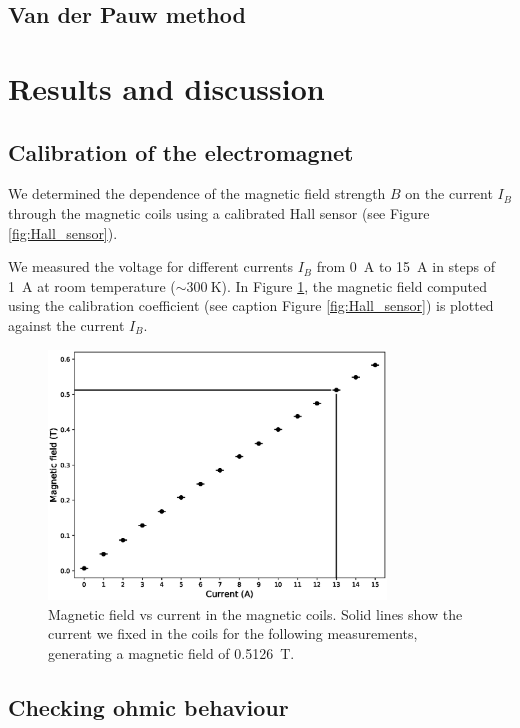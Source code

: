 \documentclass[11pt,a4paper]{article}
\begin{document}
\subsection{Van der Pauw method}

\section{Results and discussion}

\subsection{Calibration of the electromagnet}

We determined the dependence of the magnetic field strength $B$ on the current $I_B$ through the magnetic coils using a calibrated Hall sensor (see Figure \ref{fig:Hall_sensor}).

We measured the voltage for different currents $I_B$ from \SI{0}{\ampere} to \SI{15}{\ampere} in steps of \SI{1}{\ampere} at room temperature ($\sim\SI{300}{\kelvin}$). In Figure \ref{fig:magnetic_field}, the magnetic field computed using the calibration coefficient (see caption Figure \ref{fig:Hall_sensor}) is plotted against the current $I_B$.

\begin{figure}[H]
\centering
\includegraphics[width=0.8\textwidth]{Magnetic_field_vs_current.eps}
\caption{Magnetic field vs current in the magnetic coils. Solid lines show the current we fixed in the coils for the following measurements, generating a magnetic field of \SI{0.5126}{\tesla}.}
\label{fig:magnetic_field}
\end{figure}

\subsection{Checking ohmic behaviour}
\end{document}
